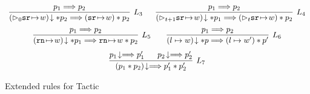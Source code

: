 \begin{figure}[!t]
    \[
        \begin{array}{c}
            \infer[L_3]
            {
                \nxtAst{(\dlyregst{0}{\sr}{\word})} \sepstar \astP_2 \Longrightarrow 
                (\regst{\sr}{\word}) \sepstar \astP_2
            }
            {
                \astP_1 \Longrightarrow \astP_2
            } \quad \ \ 
            \infer[L_4]
            {
                \nxtAst{(\dlyregst{t+1}{\sr}{\word})} \sepstar \astP_1 \Longrightarrow 
                (\dlyregst{t}{\sr}{\word}) \sepstar \astP_2
            }
            {
                \astP_1 \Longrightarrow \astP_2
            } \\
            \\[-5pt]
            \infer[L_5]
            {
                \nxtAst{(\regst{\regN}{\word})} \sepstar \astP_1 \Longrightarrow 
                \regst{\regN}{\word} \sepstar \astP_2
            }
            {
                \astP_1 \Longrightarrow \astP_2
            } \qquad 
            \infer[L_6]
            {
                \nxtAst{(\sepsto{\loc}{\word})} \sepstar \astP \Longrightarrow 
                (\sepsto{\loc}{\word'}) \sepstar \astP'
            }
            {
                \astP_1 \Longrightarrow \astP_2
            } \\
            \\[-5pt]
            \infer[L_7]
            {
                \nxtAst{(\astP_1 \sepstar \astP_2)}
                \Longrightarrow 
                \astP_1' \sepstar \astP_2'
            }
            {
                \nxtAst{\astP_1} \Longrightarrow \astP_1' \quad \ \ 
                \nxtAst{\astP_2} \Longrightarrow \astP_2'
            } 
        \end{array}
    \]
    \caption{Extended rules for Tactic \sepcancel{}}
    \label{fig:ext-rule-tac-sepcancel}
\end{figure}
